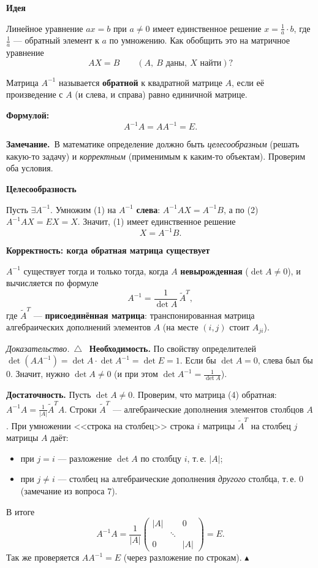 \documentclass[a4paper,11pt]{article}
\newcommand{\fm}{\par\noindent\textbf{\textcolor{oprc!85!black}{Формулой:}}}
\newcommand{\zam}{\par\smallskip\noindent\textbf{\textcolor{zamc}{Замечание.}}\ }
\newenvironment{dok}
  {\par\smallskip\noindent\textit{Доказательство.}\ $\triangle$\ \ignorespaces}
  {\unskip\nobreak\hfill$\blacktriangle$\par\smallskip}
\newcommand{\podr}[1]{\par\needspace{8\baselineskip}\medskip
  {\large\bfseries\textcolor{oprc!80!black}{#1}}\par\nopagebreak\smallskip}
\begin{document}
\podr{Идея}

Линейное уравнение $ax = b$ при $a \ne 0$ имеет единственное решение $x = \frac1a \cdot b$, где $\frac1a$ --- обратный элемент к $a$
по умножению. Как обобщить это на матричное уравнение
\[
  AX = B \qquad (A,\ B \text{ даны},\ X \text{ найти})? \tag{1}
\]

\begin{opr}
Матрица $A^{-1}$ называется \textbf{обратной} к квадратной матрице $A$, если её произведение с $A$ (и слева, и справа)
равно единичной матрице.
\fm
\[
  A^{-1} A = A A^{-1} = E. \tag{2}
\]
\end{opr}

\zam В математике определение должно быть \emph{целесообразным} (решать какую-то задачу) и \emph{корректным}
(применимым к каким-то объектам). Проверим оба условия.

\podr{Целесообразность}

Пусть $\exists A^{-1}$. Умножим (1) на $A^{-1}$ \textbf{слева}: $A^{-1} A X = A^{-1} B$, а по (2) $A^{-1} A X = E X = X$.
Значит, (1) имеет единственное решение
\[
  X = A^{-1} B. \tag{3}
\]

\podr{Корректность: когда обратная матрица существует}

\begin{teo}
$A^{-1}$ существует тогда и только тогда, когда $A$ \textbf{невырожденная} ($\det A \ne 0$), и вычисляется по формуле
\[
  A^{-1} = \frac{1}{\det A}\, \tilde A^T, \tag{4}
\]
где $\tilde A^T$ --- \textbf{присоединённая матрица}: транспонированная матрица алгебраических дополнений элементов $A$
(на месте $(i, j)$ стоит $A_{ji}$).
\end{teo}

\begin{dok}
\textbf{Необходимость.} По свойству определителей $\det(A A^{-1}) = \det A \cdot \det A^{-1} = \det E = 1$.
Если бы $\det A = 0$, слева был бы $0$. Значит, нужно $\det A \ne 0$ (и при этом $\det A^{-1} = \frac{1}{\det A}$).

\textbf{Достаточность.} Пусть $\det A \ne 0$. Проверим, что матрица (4) обратная: $A^{-1} A = \frac{1}{|A|} \tilde A^T A$.
Строки $\tilde A^T$ --- алгебраические дополнения элементов столбцов $A$. При умножении <<строка на столбец>>
строка $i$ матрицы $\tilde A^T$ на столбец $j$ матрицы $A$ даёт:
\begin{itemize}[leftmargin=*]
  \item при $j = i$ --- разложение $\det A$ по столбцу $i$, т.\,е. $|A|$;
  \item при $j \ne i$ --- столбец на алгебраические дополнения \emph{другого} столбца, т.\,е. $0$ (замечание из вопроса 7).
\end{itemize}
В итоге
\[
  A^{-1} A = \frac{1}{|A|} \begin{pmatrix} |A| & & 0 \\ & \ddots & \\ 0 & & |A| \end{pmatrix} = E.
\]
Так же проверяется $A A^{-1} = E$ (через разложение по строкам).
\end{dok}
\end{document}
